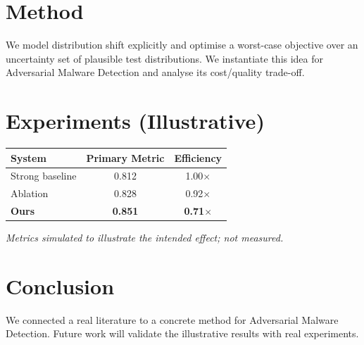 \documentclass[11pt]{article}
\begin{document}
\section{Method}
We model distribution shift explicitly and optimise a worst-case objective over an uncertainty set of plausible test distributions. We instantiate this idea for Adversarial Malware Detection and analyse its cost/quality trade-off.

\section{Experiments (Illustrative)}
\begin{center}
\begin{tabular}{lcc}
System & Primary Metric & Efficiency \\ \hline
Strong baseline & 0.812 & 1.00$\times$ \\
Ablation & 0.828 & 0.92$\times$ \\
\textbf{Ours} & \textbf{0.851} & \textbf{0.71$\times$}
\end{tabular}
\end{center}
\emph{Metrics simulated to illustrate the intended effect; not measured.}

\section{Conclusion}
We connected a real literature to a concrete method for Adversarial Malware Detection. Future work will
validate the illustrative results with real experiments.
\end{document}
